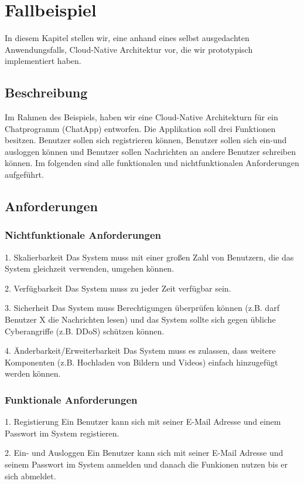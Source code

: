\chapter{Fallbeispiel}
In diesem Kapitel stellen wir, eine anhand eines selbst ausgedachten Anwendungsfalls, Cloud-Native Architektur vor, die wir prototypisch implementiert haben.

\section{Beschreibung}
Im Rahmen des Beispiels, haben wir eine Cloud-Native Architekturn für ein Chatprogramm (ChatApp) entworfen. Die Applikation soll drei Funktionen besitzen. Benutzer sollen sich registrieren können, Benutzer sollen sich ein-und ausloggen können und Benutzer sollen Nachrichten an andere Benutzer schreiben können. Im folgenden sind alle funktionalen und nichtfunktionalen Anforderungen aufgeführt.


\section{Anforderungen}
\subsection{Nichtfunktionale Anforderungen}
1. Skalierbarkeit
Das System muss mit einer großen Zahl von Benutzern, die das System gleichzeit verwenden, umgehen können.

2. Verfügbarkeit
Das System muss zu jeder Zeit verfügbar sein.

3. Sicherheit
Das System muss Berechtigungen überprüfen können (z.B. darf Benutzer X die Nachrichten lesen) und das System sollte sich gegen übliche Cyberangriffe (z.B. DDoS) schützen können.

4. Änderbarkeit/Erweiterbarkeit
Das System muss es zulassen, dass weitere Komponenten (z.B. Hochladen von Bildern und Videos) einfach hinzugefügt werden können.

\subsection{Funktionale Anforderungen}
1. Registierung
Ein Benutzer kann sich mit seiner E-Mail Adresse und einem Passwort im System registieren.

2. Ein- und Ausloggen
Ein Benutzer kann sich mit seiner E-Mail Adresse und seinem Passwort im System anmelden und danach die Funkionen nutzen bis er sich abmeldet.

